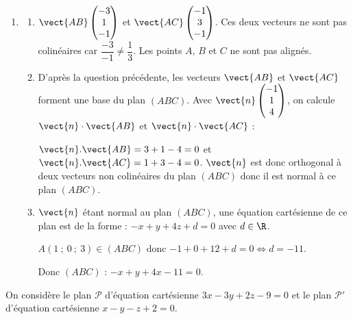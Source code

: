 \begin{enumerate}
\item 
	\begin{enumerate}
	\item $\vect{AB}\begin{pmatrix}-3\\1\\-1\end{pmatrix}$ et $\vect{AC}\begin{pmatrix}-1\\3\\-1\end{pmatrix}$. Ces deux vecteurs ne sont pas colinéaires car $\dfrac{-3}{-1}\neq \dfrac{1}{3}$. Les points $A$, $B$ et $C$ ne sont pas alignés.
	\item D'après la question précédente, les vecteurs $\vect{AB}$ et $\vect{AC}$ forment une base du plan $(ABC)$.
	Avec $\vect{n}\begin{pmatrix}-1\\1\\4\end{pmatrix}$, on calcule $\vect{n}\cdot\vect{AB}$ et $\vect{n}\cdot\vect{AC}$ :
	
	$\vect{n}.\vect{AB}=3+1-4=0$ et $\vect{n}.\vect{AC}=1+3-4=0$. $\vect{n}$ est donc orthogonal à deux vecteurs non colinéaires du plan $(ABC)$ donc il est normal à ce plan $(ABC)$.
	\item $\vect{n}$ étant normal au plan $(ABC)$, une équation cartésienne de ce plan est de la forme : $-x+y+4z+d=0$ avec $d \in \R$.

$A(1~;~0~;~3) \in (ABC)$ donc $-1+0+12+d=0 \iff d=-11$.

Donc $(ABC)$ : $-x+y+4x-11=0$.
	\end{enumerate}
\end{enumerate}

On considère le plan $\mathcal{P}$ d'équation cartésienne $3x - 3y + 2z - 9 = 0$ et le plan $\mathcal{P}'$ d'équation cartésienne $x - y- z + 2 = 0$.

